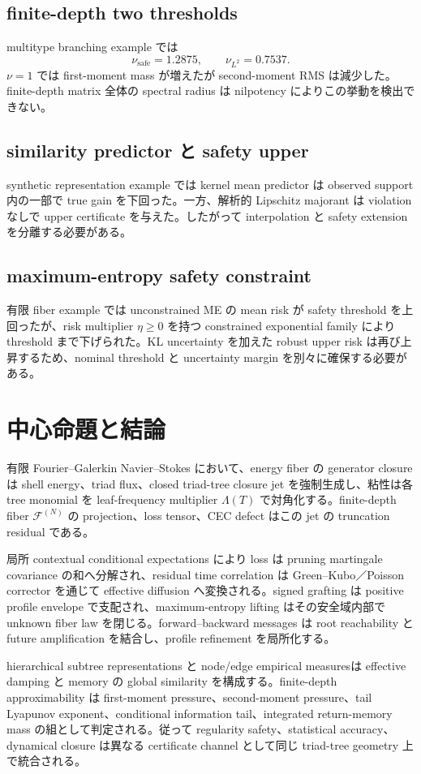 \documentclass[11pt,a4paper,openany]{book}
\numberwithin{equation}{chapter}
\newcommand{\cF}{\mathcal F}
\begin{document}
\section{finite-depth two thresholds}
multitype branching example では
\[
\nu_{\mathrm{safe}}=1.2875,
\qquad
\nu_{L^2}=0.7537.
\]
$\nu=1$ では first-moment mass が増えたが second-moment RMS は減少した。finite-depth matrix 全体の spectral radius は nilpotency によりこの挙動を検出できない。

\section{similarity predictor と safety upper}
synthetic representation example では kernel mean predictor は observed support 内の一部で true gain を下回った。一方、解析的 Lipschitz majorant は violation なしで upper certificate を与えた。したがって interpolation と safety extension を分離する必要がある。

\section{maximum-entropy safety constraint}
有限 fiber example では unconstrained ME の mean risk が safety threshold を上回ったが、risk multiplier $\eta\ge0$ を持つ constrained exponential family により threshold まで下げられた。KL uncertainty を加えた robust upper risk は再び上昇するため、nominal threshold と uncertainty margin を別々に確保する必要がある。

\chapter{中心命題と結論}
\begin{tcolorbox}[colback=softblue,colframe=deepblue,boxrule=0.7pt,arc=1mm,title={統合中心命題}]
有限 Fourier--Galerkin Navier--Stokes において、energy fiber の generator closure は shell energy、triad flux、closed triad-tree closure jet を強制生成し、粘性は各 tree monomial を leaf-frequency multiplier $\Lambda(T)$ で対角化する。finite-depth fiber $\cF^{(N)}$ の projection、loss tensor、CEC defect はこの jet の truncation residual である。

局所 contextual conditional expectations により loss は pruning martingale covariance の和へ分解され、residual time correlation は Green--Kubo／Poisson corrector を通じて effective diffusion へ変換される。signed grafting は positive profile envelope で支配され、maximum-entropy lifting はその安全域内部で unknown fiber law を閉じる。forward--backward messages は root reachability と future amplification を結合し、profile refinement を局所化する。

hierarchical subtree representations と node/edge empirical measuresは effective damping と memory の global similarity を構成する。finite-depth approximability は first-moment pressure、second-moment pressure、tail Lyapunov exponent、conditional information tail、integrated return-memory mass の組として判定される。従って regularity safety、statistical accuracy、dynamical closure は異なる certificate channel として同じ triad-tree geometry 上で統合される。
\end{tcolorbox}
\end{document}
